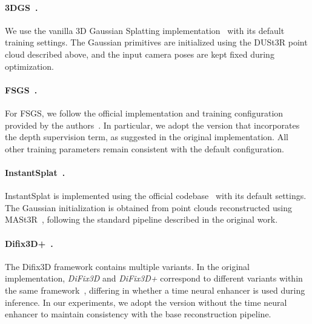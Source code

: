 \documentclass[runningheads]{llncs}
\begin{document}

\paragraph{3DGS~\cite{kerbl20233d}.}
We use the vanilla 3D Gaussian Splatting implementation~\cite{kerbl20233d} with its default training settings. 
The Gaussian primitives are initialized using the DUSt3R point cloud described above, and the input camera poses are kept fixed during optimization.

\paragraph{FSGS~\cite{zhu2024fsgs}.}
For FSGS, we follow the official implementation and training configuration provided by the authors~\cite{zhu2024fsgs}. In particular, we adopt the version that incorporates the depth supervision term, as suggested in the original implementation. All other training parameters remain consistent with the default configuration.

\paragraph{InstantSplat~\cite{fan2024instantsplat}.}
InstantSplat is implemented using the official codebase~\cite{fan2024instantsplat} with its default settings. The Gaussian initialization is obtained from point clouds reconstructed using MASt3R~\cite{duisterhof2025mastrsfm}, following the standard pipeline described in the original work.

\paragraph{Difix3D+~\cite{wu2025difix3d+}.}
The Difix3D framework contains multiple variants. In the original implementation, \textit{DiFix3D} and \textit{DiFix3D+} correspond to different variants within the same framework~\cite{wu2025difix3d+}, differing in whether a time neural enhancer is used during inference. In our experiments, we adopt the version without the time neural enhancer to maintain consistency with the base reconstruction pipeline.
\end{document}
